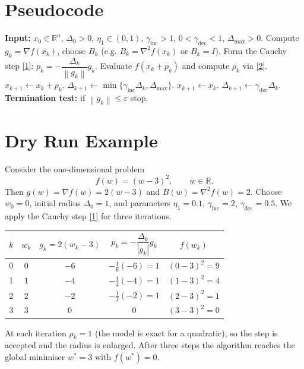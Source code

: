 \documentclass{article}
\newcommand{\norm}[1]{\left\lVert#1\right\rVert}
\newcommand{\R}{\mathbb{R}}
\begin{document}
\section*{Pseudocode}
\begin{algorithm}[H]
\caption{TR‑AP}
\begin{algorithmic}[1]
\STATE \textbf{Input:} $x_{0}\in\R^{n}$, $\Delta_{0}>0$, 
$\eta_{1}\in(0,1)$, $\gamma_{\text{inc}}>1$, $0<\gamma_{\text{dec}}<1$, $\Delta_{\max}>0$.
    \STATE Compute $g_{k}=\nabla f(x_{k})$, choose $B_{k}$ (e.g. $B_{k}= \nabla^{2}f(x_{k})$ or $B_{k}=I$).
    \STATE Form the Cauchy step \eqref{1}: $p_{k}= -\dfrac{\Delta_{k}}{\norm{g_{k}}}g_{k}$.
    \STATE Evaluate $f(x_{k}+p_{k})$ and compute $\rho_{k}$ via \eqref{2}.
        \STATE $x_{k+1}\gets x_{k}+p_{k}$.
        \STATE $\Delta_{k+1}\gets\min\{\gamma_{\text{inc}}\Delta_{k},\Delta_{\max}\}$.
    \ELSE
        \STATE $x_{k+1}\gets x_{k}$.
        \STATE $\Delta_{k+1}\gets\gamma_{\text{dec}}\Delta_{k}$.
    \ENDIF
    \STATE \textbf{Termination test:} if $\norm{g_{k}}\le\varepsilon$ stop.
\ENDFOR
\end{algorithmic}
\end{algorithm}

\section*{Dry Run Example}
Consider the one‑dimensional problem
\[
f(w)=(w-3)^{2},\qquad w\in\R.
\]
Then $g(w)=\nabla f(w)=2(w-3)$ and $B(w)=\nabla^{2}f(w)=2$.  
Choose $w_{0}=0$, initial radius $\Delta_{0}=1$, and parameters
$\eta_{1}=0.1$, $\gamma_{\text{inc}}=2$, $\gamma_{\text{dec}}=0.5$.
We apply the Cauchy step \eqref{1} for three iterations.

\begin{center}
\begin{tabular}{c|c|c|c|c}
$k$ & $w_{k}$ & $g_{k}=2(w_{k}-3)$ & $p_{k}= -\dfrac{\Delta_{k}}{|g_{k}|}g_{k}$ & $f(w_{k})$\\ \hline
0 & $0$ & $-6$ & $- \frac{1}{6}(-6)= 1$ & $(0-3)^{2}=9$\\
1 & $1$ & $-4$ & $- \frac{1}{4}(-4)= 1$ & $(1-3)^{2}=4$\\
2 & $2$ & $-2$ & $- \frac{1}{2}(-2)= 1$ & $(2-3)^{2}=1$\\
3 & $3$ & $0$  & $0$ & $(3-3)^{2}=0$
\end{tabular}
\end{center}
At each iteration $\rho_{k}=1$ (the model is exact for a quadratic), so the step is accepted and the radius is enlarged. After three steps the algorithm reaches the global minimiser $w^{*}=3$ with $f(w^{*})=0$.
\end{document}
